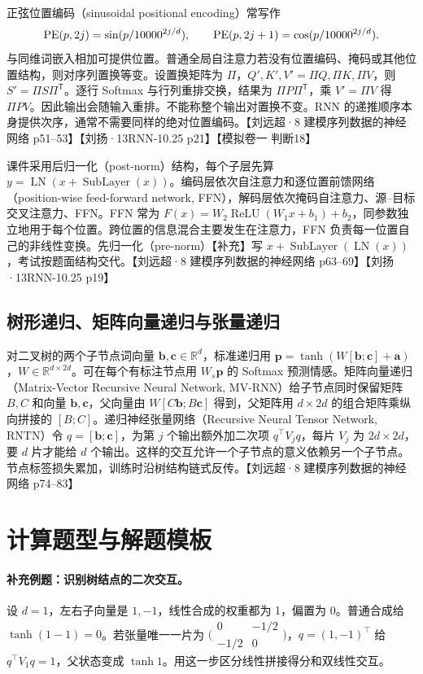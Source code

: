 \documentclass[UTF8,a4paper,zihao=-4,fontset=fandol]{ctexrep}
\begin{document}
正弦位置编码（sinusoidal positional encoding）常写作
\[
 {\rm PE}(p,2j)=\sin(p/10000^{2j/d}),\qquad
 {\rm PE}(p,2j+1)=\cos(p/10000^{2j/d}).
\]
与同维词嵌入相加可提供位置。普通全局自注意力若没有位置编码、掩码或其他位置结构，则对序列置换等变。设置换矩阵为 $\Pi$，$Q',K',V'=\Pi Q,\Pi K,\Pi V$，则 $S'=\Pi S\Pi^{\mathsf T}$。逐行 Softmax 与行列重排交换，结果为 $\Pi P\Pi^{\mathsf T}$，乘 $V'=\Pi V$ 得 $\Pi PV$。因此输出会随输入重排。不能称整个输出对置换不变。RNN 的递推顺序本身提供次序，通常不需要同样的绝对位置编码。【刘远超·8 建模序列数据的神经网络 p51--53】【刘扬·13RNN-10.25 p21】【模拟卷一 判断18】

课件采用后归一化（post-norm）结构，每个子层先算 $y=\operatorname{LN}(x+\operatorname{SubLayer}(x))$。编码层依次自注意力和逐位置前馈网络（position-wise feed-forward network, FFN），解码层依次掩码自注意力、源--目标交叉注意力、FFN。FFN 常为
$F(x)=W_2\operatorname{ReLU}(W_1x+b_1)+b_2$，同参数独立地用于每个位置。跨位置的信息混合主要发生在注意力，FFN 负责每一位置自己的非线性变换。先归一化（pre-norm）【补充】写 $x+\operatorname{SubLayer}(\operatorname{LN}(x))$，考试按题面结构交代。【刘远超·8 建模序列数据的神经网络 p63--69】【刘扬·13RNN-10.25 p19】

\subsection*{树形递归、矩阵向量递归与张量递归}
对二叉树的两个子节点词向量 $\bm b,\bm c\in\mathbb R^d$，标准递归用 $\bm p=\tanh(W[\bm b;\bm c]+\bm a)$，$W\in\mathbb R^{d\times2d}$。可在每个有标注节点用 $W_s\bm p$ 的 Softmax 预测情感。矩阵向量递归（Matrix-Vector Recursive Neural Network, MV-RNN）给子节点同时保留矩阵 $B,C$ 和向量 $\bm b,\bm c$，父向量由 $W[C\bm b;B\bm c]$ 得到，父矩阵用 $d\times2d$ 的组合矩阵乘纵向拼接的 $[B;C]$。递归神经张量网络（Recursive Neural Tensor Network, RNTN）令 $q=[\bm b;\bm c]$，为第 $j$ 个输出额外加二次项 $q^\top V_jq$，每片 $V_j$ 为 $2d\times2d$，要 $d$ 片才能给 $d$ 个输出。这样的交互允许一个子节点的意义依赖另一个子节点。节点标签损失累加，训练时沿树结构链式反传。【刘远超·8 建模序列数据的神经网络 p74–83】

\section{计算题型与解题模板}

\paragraph{补充例题：识别树结点的二次交互。}
设 $d=1$，左右子向量是 $1,-1$，线性合成的权重都为 1，偏置为 0。普通合成给 $\tanh(1-1)=0$。若张量唯一一片为 $\bigl(\begin{smallmatrix}0&-1/2\\-1/2&0\end{smallmatrix}\bigr)$，$q=(1,-1)^\top$ 给 $q^\top V_1q=1$，父状态变成 $\tanh 1$。用这一步区分线性拼接得分和双线性交互。
\end{document}
